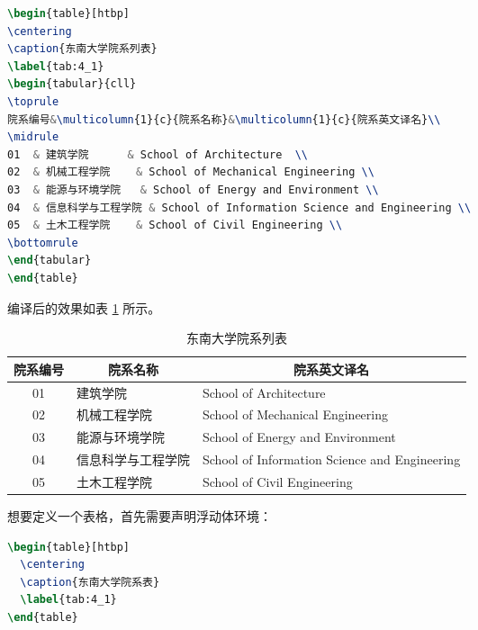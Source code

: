 \begin{tcolorbox}
\begin{lstlisting}[language=TeX]
\begin{table}[htbp]
\centering
\caption{东南大学院系列表}
\label{tab:4_1}
\begin{tabular}{cll}
\toprule
院系编号&\multicolumn{1}{c}{院系名称}&\multicolumn{1}{c}{院系英文译名}\\
\midrule
01  & 建筑学院      & School of Architecture  \\
02  & 机械工程学院    & School of Mechanical Engineering \\
03  & 能源与环境学院   & School of Energy and Environment \\
04  & 信息科学与工程学院 & School of Information Science and Engineering \\
05  & 土木工程学院    & School of Civil Engineering \\
\bottomrule
\end{tabular}
\end{table}
\end{lstlisting}
\end{tcolorbox}

\noindent 编译后的效果如表 \ref{tab:4_1} 所示。

\begin{table}[htbp]
\centering
\caption{东南大学院系列表}
\label{tab:4_1}
\begin{tabular}{cll}
\toprule
院系编号 & \multicolumn{1}{c}{院系名称}       & \multicolumn{1}{c}{院系英文译名 }     \\
\midrule
01                       & 建筑学院      & School of Architecture                        \\
02                       & 机械工程学院    & School of Mechanical Engineering              \\
03                       & 能源与环境学院   & School of Energy and Environment              \\
04                       & 信息科学与工程学院 & School of Information Science and Engineering \\
05                       & 土木工程学院    & School of Civil Engineering \\
\bottomrule
\end{tabular}
\end{table}

\noindent 想要定义一个表格，首先需要声明浮动体环境：

\begin{tcolorbox}
\begin{lstlisting}[language=TeX]
\begin{table}[htbp]
  \centering
  \caption{东南大学院系表}
  \label{tab:4_1}
\end{table}
\end{lstlisting}
\end{tcolorbox}

